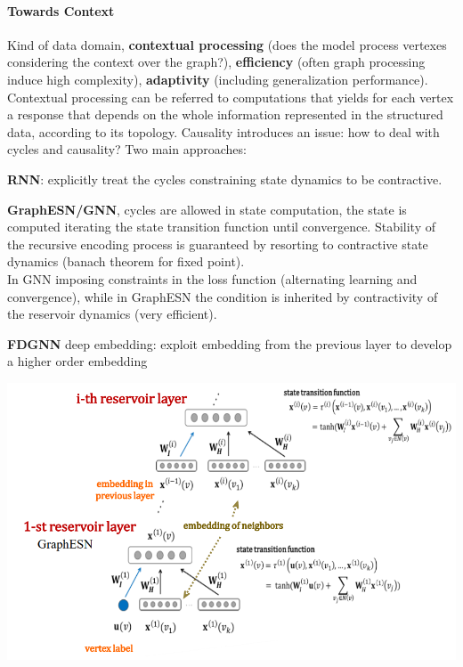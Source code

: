 \documentclass[10pt]{report}
\begin{document}
\paragraph{Towards Context} Kind of data domain, \textbf{contextual processing} (does the model process vertexes considering the context over the graph?), \textbf{efficiency} (often graph processing induce high complexity), \textbf{adaptivity} (including generalization performance).\\
Contextual processing can be referred to computations that yields for each vertex a response that depends on the whole information represented in the structured data, according to its topology. Causality introduces an issue: how to deal with cycles and causality? Two main approaches:\begin{list}{}{}
	\item \textbf{RNN}: explicitly treat the cycles constraining state dynamics to be contractive.\begin{list}{}{}
		\item \textbf{GraphESN/GNN}, cycles are allowed in state computation, the state is computed iterating the state transition function until convergence. Stability of the recursive encoding process is guaranteed by resorting to contractive state dynamics (banach theorem for fixed point).\\
		In GNN imposing constraints in the loss function (alternating learning and convergence), while in GraphESN the condition is inherited by contractivity of the reservoir dynamics (very efficient).
		\item \textbf{FDGNN} deep embedding: exploit embedding from the previous layer to develop a higher order embedding\begin{center}
			\includegraphics[scale=0.5]{47.png}

\end{center}
\end{list}
\end{list}
\end{document}
